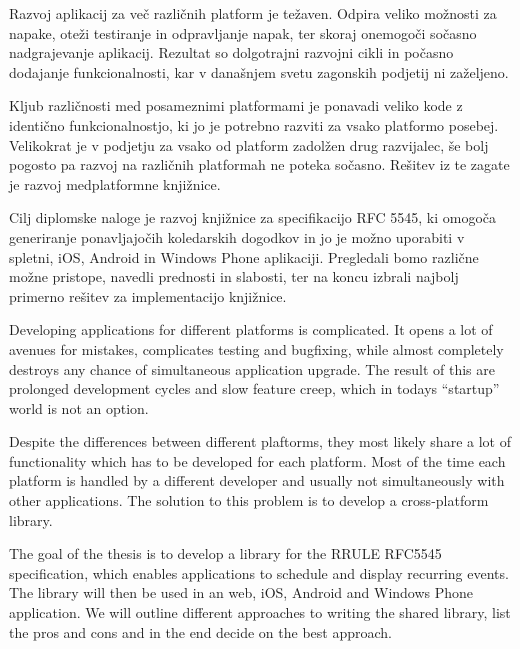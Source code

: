 








\begin{Povzetek}

Razvoj aplikacij za več različnih platform je težaven. Odpira veliko možnosti za napake, oteži testiranje in odpravljanje napak, ter skoraj onemogoči sočasno nadgrajevanje aplikacij. Rezultat so dolgotrajni razvojni cikli in počasno dodajanje funkcionalnosti, kar v današnjem svetu zagonskih podjetij ni zaželjeno.

Kljub različnosti med posameznimi platformami je ponavadi veliko kode z identično funkcionalnostjo, ki jo je potrebno razviti za vsako platformo posebej. Velikokrat je v podjetju za vsako od platform zadolžen drug razvijalec, še bolj pogosto pa razvoj na različnih platformah ne poteka sočasno. Rešitev iz te zagate je razvoj medplatformne knjižnice.

Cilj diplomske naloge je razvoj knjižnice za specifikacijo RFC 5545\cite{rfc5545}, ki omogoča generiranje ponavljajočih koledarskih dogodkov in jo je možno uporabiti v spletni, iOS, Android in Windows Phone aplikaciji. Pregledali bomo različne možne pristope, navedli prednosti in slabosti, ter na koncu izbrali najbolj primerno rešitev za implementacijo knjižnice.
\end{Povzetek}









\begin{Abstract}

Developing applications for different platforms is complicated. It opens a lot of avenues for mistakes, complicates testing and bugfixing, while almost completely destroys any chance of simultaneous application upgrade. The result of this are prolonged development cycles and slow feature creep, which in todays ``startup'' world is not an option.

Despite the differences between different plaftorms, they most likely share a lot of functionality which has to be developed for each platform. Most of the time each platform is handled by a different developer and usually not simultaneously with other applications. The solution to this problem is to develop a cross-platform library.

The goal of the thesis is to develop a library for the RRULE RFC5545\cite{rfc5545} specification, which enables applications to schedule and display recurring events. The library will then be used in an web, iOS, Android and Windows Phone application. We will outline different approaches to writing the shared library, list the pros and cons and in the end decide on the best approach.
\end{Abstract}
